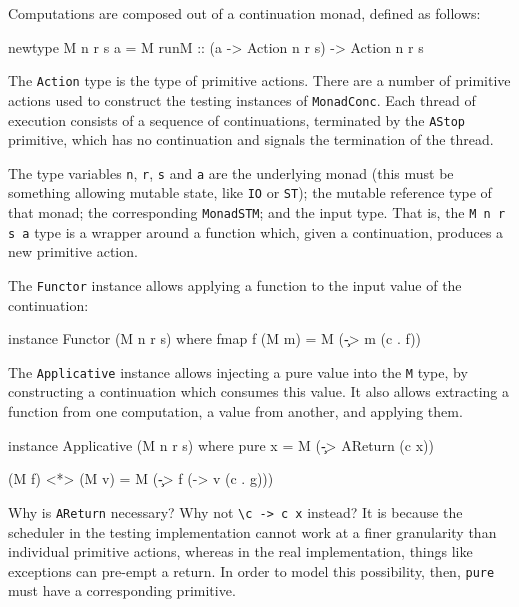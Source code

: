 Computations are composed out of a continuation monad, defined as
follows:

\begin{haskellcode}
newtype M n r s a = M { runM :: (a -> Action n r s) -> Action n r s }
\end{haskellcode}

The \verb|Action| type is the type of primitive actions. There are a
number of primitive actions used to construct the testing instances of
\verb|MonadConc|. Each thread of execution consists of a sequence of
continuations, terminated by the \verb|AStop| primitive, which has no
continuation and signals the termination of the thread.

The type variables \verb|n|, \verb|r|, \verb|s| and \verb|a| are the
underlying monad (this must be something allowing mutable state, like
\verb|IO| or \verb|ST|); the mutable reference type of that monad; the
corresponding \verb|MonadSTM|; and the input type. That is, the
\verb|M n r s a| type is a wrapper around a function which, given a
continuation, produces a new primitive action.

The \verb|Functor| instance allows applying a function to the input
value of the continuation:

\begin{haskellcode}
instance Functor (M n r s) where
  fmap f (M m) = M (\c -> m (c . f))
\end{haskellcode}

The \verb|Applicative| instance allows injecting a pure value into the
\verb|M| type, by constructing a continuation which consumes this
value. It also allows extracting a function from one computation, a
value from another, and applying them.

\begin{haskellcode}
instance Applicative (M n r s) where
  pure x = M (\c -> AReturn (c x))

  (M f) <*> (M v) = M (\c -> f (\g -> v (c . g)))
\end{haskellcode}


Why is \verb|AReturn| necessary? Why not \verb|\c -> c x| instead? It
is because the scheduler in the testing implementation cannot work at
a finer granularity than individual primitive actions, whereas in the
real implementation, things like exceptions can pre-empt a return. In
order to model this possibility, then, \verb|pure| must have a
corresponding primitive.

